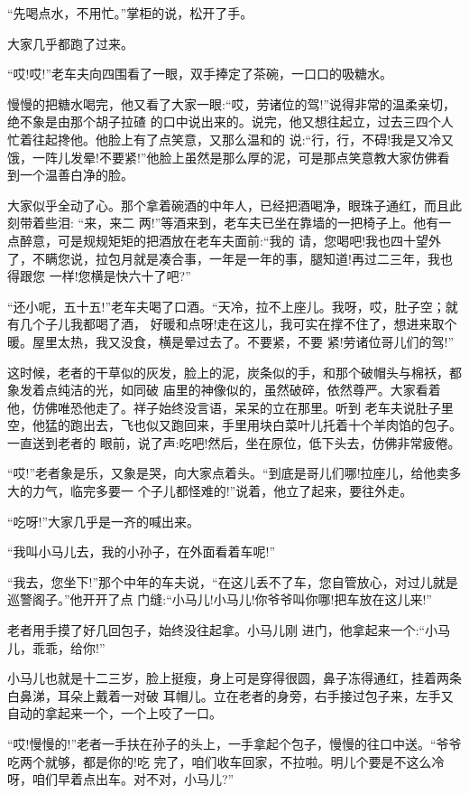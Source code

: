 \documentclass[11pt,a4paper,onecolumn]{article}
\begin{document}
``先喝点水，不用忙。''掌柜的说，松开了手。

大家几乎都跑了过来。

``哎!哎!''老车夫向四围看了一眼，双手捧定了茶碗，一口口的吸糖水。

慢慢的把糖水喝完，他又看了大家一眼:``哎，劳诸位的驾!''说得非常的温柔亲切，绝不象是由那个胡子拉碴
的口中说出来的。说完，他又想往起立，过去三四个人忙着往起搀他。他脸上有了点笑意，又那么温和的
说:``行，行，不碍!我是又冷又饿，一阵儿发晕!不要紧!''他脸上虽然是那么厚的泥，可是那点笑意教大家仿佛看
到一个温善白净的脸。

大家似乎全动了心。那个拿着碗酒的中年人，已经把酒喝净，眼珠子通红，而且此刻带着些泪: ``来，来二
两!''等酒来到，老车夫已坐在靠墙的一把椅子上。他有一点醉意，可是规规矩矩的把酒放在老车夫面前:``我的
请，您喝吧!我也四十望外了，不瞒您说，拉包月就是凑合事，一年是一年的事，腿知道!再过二三年，我也得跟您
一样!您横是快六十了吧?''

``还小呢，五十五!''老车夫喝了口酒。``天冷，拉不上座儿。我呀，哎，肚子空；就有几个子儿我都喝了酒，
好暖和点呀!走在这儿，我可实在撑不住了，想进来取个暖。屋里太热，我又没食，横是晕过去了。不要紧，不要
紧!劳诸位哥儿们的驾!''

这时候，老者的干草似的灰发，脸上的泥，炭条似的手，和那个破帽头与棉袄，都象发着点纯洁的光，如同破
庙里的神像似的，虽然破碎，依然尊严。大家看着他，仿佛唯恐他走了。祥子始终没言语，呆呆的立在那里。听到
老车夫说肚子里空，他猛的跑出去，飞也似又跑回来，手里用块白菜叶儿托着十个羊肉馅的包子。一直送到老者的
眼前，说了声:吃吧!然后，坐在原位，低下头去，仿佛非常疲倦。

``哎!''老者象是乐，又象是哭，向大家点着头。``到底是哥儿们哪!拉座儿，给他卖多大的力气，临完多要一
个子儿都怪难的!''说着，他立了起来，要往外走。

``吃呀!''大家几乎是一齐的喊出来。

``我叫小马儿去，我的小孙子，在外面看着车呢!''

``我去，您坐下!''那个中年的车夫说，``在这儿丢不了车，您自管放心，对过儿就是巡警阁子。''他开开了点
门缝:``小马儿!小马儿!你爷爷叫你哪!把车放在这儿来!''

老者用手摸了好几回包子，始终没往起拿。小马儿刚 进门，他拿起来一个:``小马儿，乖乖，给你!''

小马儿也就是十二三岁，脸上挺瘦，身上可是穿得很圆，鼻子冻得通红，挂着两条白鼻涕，耳朵上戴着一对破
耳帽儿。立在老者的身旁，右手接过包子来，左手又自动的拿起来一个，一个上咬了一口。

``哎!慢慢的!''老者一手扶在孙子的头上，一手拿起个包子，慢慢的往口中送。``爷爷吃两个就够，都是你的!吃
完了，咱们收车回家，不拉啦。明儿个要是不这么冷呀，咱们早着点出车。对不对，小马儿?''
\end{document}
